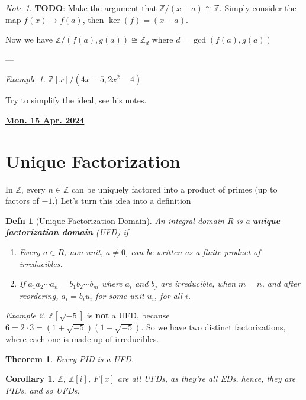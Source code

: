 \documentclass[12pt]{article}
\renewcommand{\date}[1]{\underline{\bf #1}}
\def\Z{{\mathbb Z}}
\def\TODO{\color{red}\textbf{TODO}\color{black}}
\newtheorem{theorem}{Theorem}
\newtheorem{definition}{Defn}
\newtheorem{corollary}{Corollary}
\theoremstyle{remark}
\theoremstyle{remark}
\theoremstyle{remark}
\newtheorem{example}{Example}
\theoremstyle{remark}
\theoremstyle{remark}
\newtheorem*{note}{Note}
\begin{document}
\begin{note}
  \TODO: Make the argument that $\Z / (x - a) \cong \Z$. Simply consider the map
  $f(x) \mapsto f(a)$, then $\ker(f) = (x - a)$.
\end{note}

Now we have $\Z / (f(a), g(a)) \cong \Z_d$ where $d = \gcd(f(a), g(a))$

---

\begin{example}
  $\Z[x] / (4x - 5, 2x^2 - 4)$

  Try to simplify the ideal, see his notes.
\end{example}

\date{Mon. 15 Apr. 2024}

\section{Unique Factorization}

In $\Z$, every $n \in \Z$ can be uniquely factored into a product of primes
(up to factors of $-1$.) Let's turn this idea into a definition

\begin{definition}[Unique Factorization Domain]
  An integral domain $R$ is a {\bf unique factorization domain} (UFD) if

  \begin{enumerate}
    \item Every $a \in R$, non unit, $a \ne 0$, can be written as a finite
      product of irreducibles.
    \item If $a_1 a_2 \cdots a_n = b_1 b_2 \cdots b_m$ where $a_i$ and $b_j$ are
      irreducible, when $m = n$, and after reordering, $a_i = b_i u_i$ for some
      unit $u_i$, for all $i$.
  \end{enumerate}
\end{definition}

\begin{example}
  $\Z[\sqrt{-5}]$ is {\bf not} a UFD, because $6 = 2 \cdot 3 = (1 + \sqrt{-5})(1
  - \sqrt{-5})$. So we have two distinct factorizations, where each one is made
  up of irreducibles.
\end{example}

\begin{theorem}
  Every PID is a UFD.
\end{theorem}

\begin{corollary}
  $\Z$, $\Z[i]$, $F[x]$ are all UFDs, as they're all EDs, hence, they are PIDs,
  and so UFDs.
\end{corollary}
\end{document}
